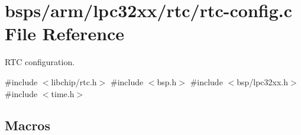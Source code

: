 \hypertarget{arm_2lpc32xx_2rtc_2rtc-config_8c}{}\section{bsps/arm/lpc32xx/rtc/rtc-\/config.c File Reference}
\label{arm_2lpc32xx_2rtc_2rtc-config_8c}


R\+TC configuration.  


{\ttfamily \#include $<$libchip/rtc.\+h$>$}\newline
{\ttfamily \#include $<$bsp.\+h$>$}\newline
{\ttfamily \#include $<$bsp/lpc32xx.\+h$>$}\newline
{\ttfamily \#include $<$time.\+h$>$}\newline
\subsection*{Macros}
